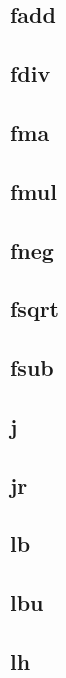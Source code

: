 \documentclass{article}
\begin{document}
\subsection*{fadd}

\subsection*{fdiv}

\subsection*{fma}

\subsection*{fmul}

\subsection*{fneg}

\subsection*{fsqrt}

\subsection*{fsub}

\subsection*{j}

\subsection*{jr}

\subsection*{lb}

\subsection*{lbu}

\subsection*{lh}
\end{document}
